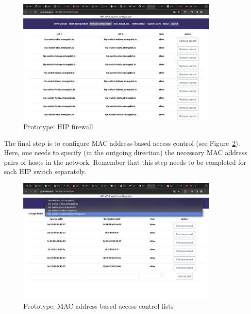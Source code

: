 \begin{figure}[h!]
\centering
\includegraphics[width=0.9\textwidth]{graphics/firewall.png}
\caption{Prototype: HIP firewall}
\label{fig:firewall}
\end{figure}
\clearpage

The final step is to configure MAC address-based access control 
(see Figure~\ref{fig:mac}). Here, one needs to specify (in the 
outgoing direction) the necessary MAC address pairs of hosts in 
the network. Remember that this step needs to be completed for 
each HIP switch separately.

\begin{figure}[h!]
\centering
\includegraphics[width=0.9\textwidth]{graphics/MAC-ACL.png}
\caption{Prototype: MAC address based access control lists}
\label{fig:mac}
\end{figure}
\clearpage


